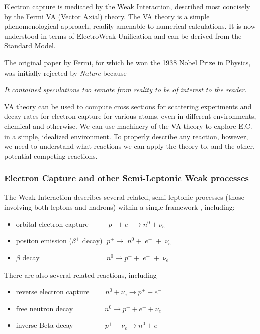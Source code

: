 \documentclass[%
 aip,
 jmp,%
 amsmath,amssymb,
 reprint,%
]{revtex4-1}
\begin{document}
Electron capture is mediated by the Weak Interaction, described most concisely by the Fermi VA (Vector Axial) theory. \cite{fermi1,ec-review1,ec-review2}
The VA theory is a simple phenomenological approach, readily amenable to numerical calculations. It is now understood in terms of ElectroWeak Unification and can be derived from the Standard Model.  

The original paper by Fermi, for which he won the 1938 Nobel Prize in Physics, was initially rejected by \emph{Nature} because 

\emph{It contained speculations too remote from reality to be of interest to the reader}.\cite{close}

VA theory can be used to compute cross sections for scattering experiments and decay rates for electron capture for various atoms,  even in different environments, chemical and otherwise.  We can use machinery of the VA theory to explore E.C. in a simple, idealized environment.  To properly describe any reaction, however, we need to understand what reactions we can apply the theory to, and the other, potential competing reactions.

\subsubsection{Electron Capture and other Semi-Leptonic Weak processes} 

The Weak Interaction describes several related, semi-leptonic processes (those involving both leptons and hadrons) within a single framework \cite{langanke}, including:

\begin{itemize}
\item orbital electron capture $\;\;\;\;\;\;\;\;\;p^{+}+e^{-} \rightarrow n^{0}+\nu_{e}$

\item positon emission ($\beta^{+}$ decay) $\;p^{+}\rightarrow\;n^{0}+\;e^{+}\;+\;\nu_{e}$ 
\item $\beta$ decay $\;\;\;\;\;\;\;\;\;\;\;\;\;\;\;\;\;\;\;\;\;\;\;\;\;\;\;\;\;\;\;\;\;n^{0}\rightarrow p^{+}+\;e^{-}\;+\;\bar{\nu_{e}}$
\end{itemize}

There are also several related reactions, including

\begin{itemize}
\item reverse electron capture  $\;\;\;\;\;\;\;n^{0}+\nu_{e}\rightarrow p^{+}+e^{-}$
\item free neutron decay  $\;\;\;\;\;\;\;\;\;\;\;\;\;\;\;n^{0}\rightarrow p^{+}+e^{-}+\bar{\nu_{e}}$ 
\item inverse Beta decay  $\;\;\;\;\;\;\;\;\;\;\;\;\;\;\;p^{+}+\bar{\nu_{e}} \rightarrow n^{0}+e^{+}$
\end{itemize}
\end{document}

